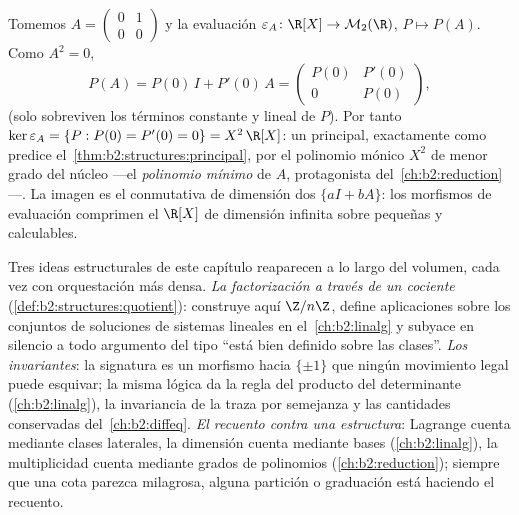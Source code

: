 \begin{example}\label{ex:b2:structures:evaluation}
Tomemos $A = \begin{pmatrix}0 & 1\\ 0 & 0\end{pmatrix}$ y la
evaluación $\varepsilon_A \colon \R[X] \to \mathcal{M}_2(\R)$, $P
\mapsto P(A)$. Como $A^2 = 0$,
\[
P(A) = P(0)\,I + P'(0)\,A =
\begin{pmatrix} P(0) & P'(0)\\ 0 & P(0)\end{pmatrix},
\]
(solo sobreviven los términos constante y lineal de $P$). Por
tanto $\ker\varepsilon_A = \{P : P(0) = P'(0) = 0\} = X^2\,\R[X]$:
un  principal, exactamente como predice el~\cref{thm:b2:structures:principal},  por el polinomio mónico
$X^2$ de menor grado del núcleo ---el \emph{polinomio mínimo} de
$A$, protagonista del~\cref{ch:b2:reduction}---. La imagen es el
 conmutativa de dimensión dos $\{aI + bA\}$: los
morfismos de evaluación comprimen el $\R[X]$ de dimensión infinita
sobre  pequeñas y calculables.
\end{example}

\begin{remark}\label{rem:b2:structures:perspectives}
Tres ideas estructurales de este capítulo reaparecen a lo largo del
volumen, cada vez con orquestación más densa. \emph{La factorización
a través de un cociente} (\cref{def:b2:structures:quotient}):
construye aquí $\Z/n\Z$, define aplicaciones sobre los conjuntos de
soluciones de sistemas lineales en el~\cref{ch:b2:linalg} y subyace
en silencio a todo argumento del tipo ``está bien definido sobre las
clases''. \emph{Los invariantes}: la signatura es un morfismo hacia
$\{\pm1\}$ que ningún movimiento legal puede esquivar; la misma
lógica da la regla del producto del determinante
(\cref{ch:b2:linalg}), la invariancia de la traza por semejanza y
las cantidades conservadas del~\cref{ch:b2:diffeq}. \emph{El
recuento contra una estructura}: Lagrange cuenta mediante clases
laterales, la dimensión cuenta mediante bases (\cref{ch:b2:linalg}),
la multiplicidad cuenta mediante grados de polinomios
(\cref{ch:b2:reduction}); siempre que una cota parezca milagrosa,
alguna partición o graduación está haciendo el recuento.
\end{remark}

